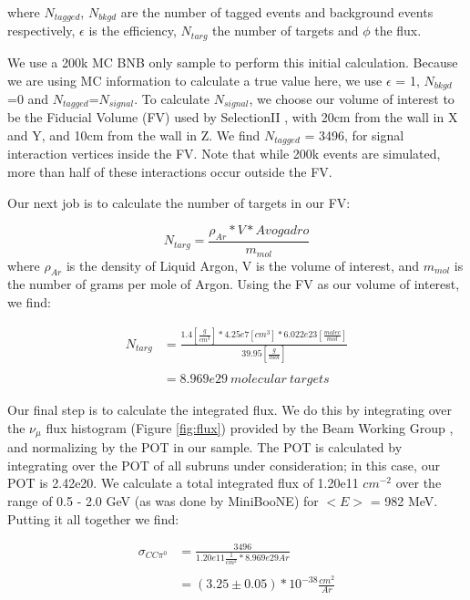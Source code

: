 \documentclass[12pt]{article}
\begin{document}
\noindent where $N_{tagged}$, $N_{bkgd}$ are the number of tagged events and background events respectively, $\epsilon$ is the efficiency, $N_{targ}$ the number of targets and $\phi$ the flux. 
\par We use a 200k MC BNB only sample to perform this initial calculation.  Because we are using MC information to calculate a true value here, we use $\epsilon$ = 1, $N_{bkgd}$=0 and $N_{tagged}$=$N_{signal}$.  To calculate $N_{signal}$, we choose our volume of interest to be the Fiducial Volume (FV) used by SelectionII \cite{bib:numucc}, with 20cm from the wall in X and Y, and 10cm from the wall in Z. We find $N_{tagged}$ = 3496, for signal interaction vertices inside the FV. Note that while 200k events are simulated, more than half of these interactions occur outside the FV. 
\par Our next job is to calculate the number of targets in our FV:

\begin{equation} \label{eq:1}
  N_{targ} = \frac{\rho_{Ar} * V * Avogadro}{m_{mol}} 
\end{equation}
\noindent where $\rho_{Ar}$ is the density of Liquid Argon, V is the volume of interest, and $m_{mol}$ is the number of grams per mole of Argon.  Using the FV as our volume of interest, we find: 

\begin{align}
N_{targ} &= \frac{1.4 [\frac{g}{cm^3}] * 4.25e7 [cm^3] * 6.022e23 [\frac{molec}{mol}]}{39.95 [\frac{g}{mol}]} \\\\
&= 8.969e29\ molecular\ targets
\end{align}


\par Our final step is to calculate the integrated flux.  We do this by integrating over the $\nu_\mu$ flux histogram (Figure \ref{fig:flux}) provided by the Beam Working Group \cite{bib:flux}, and normalizing by the POT in our sample. The POT is calculated by integrating over the POT of all subruns under consideration; in this case, our POT is 2.42e20.  We calculate a total integrated flux of 1.20e11 $cm^{-2}$ over the range of 0.5 - 2.0 GeV (as was done by MiniBooNE) for $<E>$ = 982 MeV. 
\noindent Putting it all together we find:


\begin{align}
\sigma_{CC\pi^0} &= \frac{3496}{1.20e11 \frac{1}{cm^2} * 8.969e29 Ar } \\\\
&= (3.25 \pm 0.05) *10^{-38} \frac{cm^2}{Ar}
\end{align}
\end{document}
